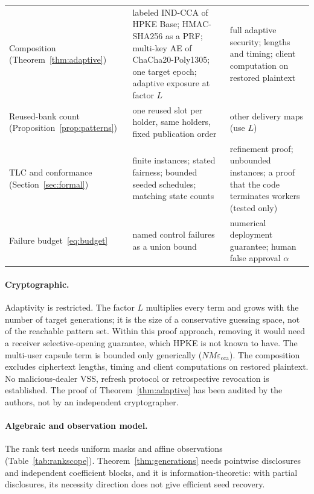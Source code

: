 \documentclass[pdflatex,sn-mathphys-num,twocolumn]{sn-jnl}
\theoremstyle{plain}
\theoremstyle{definition}
\begin{document}
\begin{table}[t]
\begin{tabularx}{\linewidth}{@{}>{\raggedright\arraybackslash}p{.20\linewidth}YY@{}}
Composition (Theorem~\ref{thm:adaptive}) & labeled IND-CCA of HPKE Base; HMAC-SHA256 as a PRF; multi-key AE of ChaCha20-Poly1305; one target epoch; adaptive exposure at factor $L$ & full adaptive security; lengths and timing; client computation on restored plaintext\\
Reused-bank count (Proposition~\ref{prop:patterns}) & one reused slot per holder, same holders, fixed publication order & other delivery maps (use $L$)\\
TLC and conformance (Section~\ref{sec:formal}) & finite instances; stated fairness; bounded seeded schedules; matching state counts & refinement proof; unbounded instances; a proof that the code terminates workers (tested only)\\
Failure budget~\eqref{eq:budget} & named control failures as a union bound & numerical deployment guarantee; human false approval $\alpha$\\\bottomrule
\end{tabularx}
\end{table}

\paragraph{Cryptographic.}
Adaptivity is restricted. The factor $L$ multiplies every term and grows with the number of target generations; it is the size of a conservative guessing space, not of the reachable pattern set. Within this proof approach, removing it would need a receiver selective-opening guarantee, which HPKE is not known to have. The multi-user capsule term is bounded only generically ($NM\varepsilon_{\mathrm{cca}}$). The composition excludes ciphertext lengths, timing and client computations on restored plaintext. No malicious-dealer VSS, refresh protocol or retrospective revocation is established. The proof of Theorem~\ref{thm:adaptive} has been audited by the authors, not by an independent cryptographer.

\paragraph{Algebraic and observation model.}
The rank test needs uniform masks and affine observations (Table~\ref{tab:rankscope}). Theorem~\ref{thm:generations} needs pointwise disclosures and independent coefficient blocks, and it is information-theoretic: with partial disclosures, its necessity direction does not give efficient seed recovery.
\end{document}
